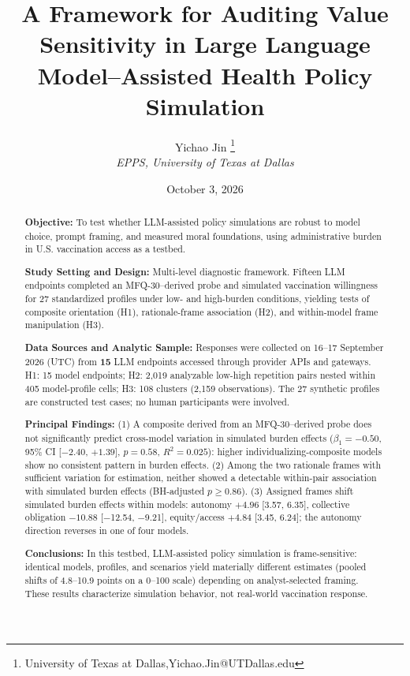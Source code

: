 \documentclass[12pt,a4paper]{article}
\title{A Framework for Auditing Value Sensitivity in Large Language Model--Assisted Health Policy Simulation}
\author{Yichao Jin \thanks{University of Texas at Dallas,Yichao.Jin@UTDallas.edu} \\
\textit{ EPPS, University of Texas at Dallas }}
\date{October 3, 2026}
\begin{document}
\maketitle


\begin{abstract}

\noindent\textbf{Objective:} To test whether LLM-assisted policy simulations are robust to model choice, prompt framing, and measured moral foundations, using administrative burden in U.S. vaccination access as a testbed.

\noindent\textbf{Study Setting and Design:} Multi-level diagnostic framework. Fifteen LLM endpoints completed an MFQ-30--derived probe and simulated vaccination willingness for 27 standardized profiles under low- and high-burden conditions, yielding tests of composite orientation (H1), rationale-frame association (H2), and within-model frame manipulation (H3).

\noindent\textbf{Data Sources and Analytic Sample:} Responses were collected on 16--17 September 2026 (UTC) from \textbf{15} LLM endpoints accessed through provider APIs and gateways. H1: 15 model endpoints; H2: 2,019 analyzable low-high repetition pairs nested within 405 model-profile cells; H3: 108 clusters (2,159 observations). The 27 synthetic profiles are constructed test cases; no human participants were involved.

\noindent\textbf{Principal Findings:} 
(1) A composite derived from an MFQ-30--derived probe does not significantly predict cross-model variation in simulated burden effects ($\beta_1 = -0.50$, 95\% CI [$-2.40$, $+1.39$], $p = 0.58$, $R^2 = 0.025$): higher individualizing-composite models show no consistent pattern in burden effects.
(2) Among the two rationale frames with sufficient variation for estimation, neither showed a detectable within-pair association with simulated burden effects (BH-adjusted \(p \geq 0.86\)).
(3) Assigned frames shift simulated burden effects within models: autonomy $+4.96$ [3.57, 6.35], collective obligation $-10.88$ [$-$12.54, $-$9.21], equity/access $+4.84$ [3.45, 6.24]; the autonomy direction reverses in one of four models.

\noindent\textbf{Conclusions:} In this testbed, LLM-assisted policy simulation is frame-sensitive: identical models, profiles, and scenarios yield materially different estimates (pooled shifts of 4.8--10.9 points on a 0--100 scale) depending on analyst-selected framing. These results characterize simulation behavior, not real-world vaccination response.


\end{abstract}
\end{document}
